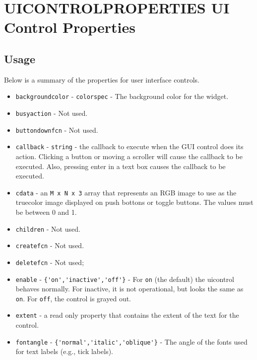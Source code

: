 \section{UICONTROLPROPERTIES UI Control Properties}

\subsection{Usage}

Below is a summary of the properties for user interface
controls.
\begin{itemize}
\item  \verb|backgroundcolor| - \verb|colorspec| - The background color
 for the widget.

\item  \verb|busyaction| - Not used.

\item  \verb|buttondownfcn| - Not used.

\item  \verb|callback| - \verb|string| - the callback to execute when the 
GUI control does its action.  Clicking a button or moving a 
scroller will cause the callback to be executed.  Also, pressing 
enter in a text box causes the callback to be executed.

\item  \verb|cdata| - an \verb|M x N x 3| array that represents an RGB image
to use as the truecolor image displayed on push bottons or toggle
buttons.  The values must be between 0 and 1.

\item  \verb|children| - Not used.

\item  \verb|createfcn| - Not used.

\item  \verb|deletefcn| - Not used;

\item  \verb|enable| - \verb|{'on','inactive','off'}| - For \verb|on| (the
default) the uicontrol behaves normally.  For inactive, it is not
operational, but looks the same as \verb|on|.  For \verb|off|, the
control is grayed out.

\item  \verb|extent| - a read only property that contains the extent of
the text for the control.

\item  \verb|fontangle| - \verb|{'normal','italic','oblique'}| - The angle of the fonts used
 for text labels (e.g., tick labels).


\end{itemize}
